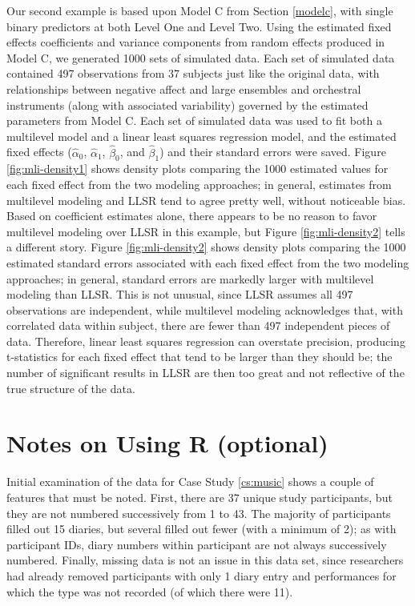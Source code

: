 \documentclass[
]{krantz}
\begin{document}
Our second example is based upon Model C from Section \ref{modelc}, with single binary predictors at both Level One and Level Two. Using the estimated fixed effects coefficients and variance components from random effects produced in Model C, we generated 1000 sets of simulated data. Each set of simulated data contained 497 observations from 37 subjects just like the original data, with relationships between negative affect and large ensembles and orchestral instruments (along with associated variability) governed by the estimated parameters from Model C. Each set of simulated data was used to fit both a multilevel model and a linear least squares regression model, and the estimated fixed effects (\(\hat{\alpha}_{0}\), \(\hat{\alpha}_{1}\), \(\hat{\beta}_{0}\), and \(\hat{\beta}_{1}\)) and their standard errors were saved. Figure \ref{fig:mli-density1} shows density plots comparing the 1000 estimated values for each fixed effect from the two modeling approaches; in general, estimates from multilevel modeling and LLSR tend to agree pretty well, without noticeable bias. Based on coefficient estimates alone, there appears to be no reason to favor multilevel modeling over LLSR in this example, but Figure \ref{fig:mli-density2} tells a different story. Figure \ref{fig:mli-density2} shows density plots comparing the 1000 estimated standard errors associated with each fixed effect from the two modeling approaches; in general, standard errors are markedly larger with multilevel modeling than LLSR. This is not unusual, since LLSR assumes all 497 observations are independent, while multilevel modeling acknowledges that, with correlated data within subject, there are fewer than 497 independent pieces of data. Therefore, linear least squares regression can overstate precision, producing t-statistics for each fixed effect that tend to be larger than they should be; the number of significant results in LLSR are then too great and not reflective of the true structure of the data.

\hypertarget{notesr8}{%
\section{Notes on Using R (optional)}\label{notesr8}}

Initial examination of the data for Case Study \ref{cs:music} shows a couple of features that must be noted. First, there are 37 unique study participants, but they are not numbered successively from 1 to 43. The majority of participants filled out 15 diaries, but several filled out fewer (with a minimum of 2); as with participant IDs, diary numbers within participant are not always successively numbered. Finally, missing data is not an issue in this data set, since researchers had already removed participants with only 1 diary entry and performances for which the type was not recorded (of which there were 11).
\end{document}
